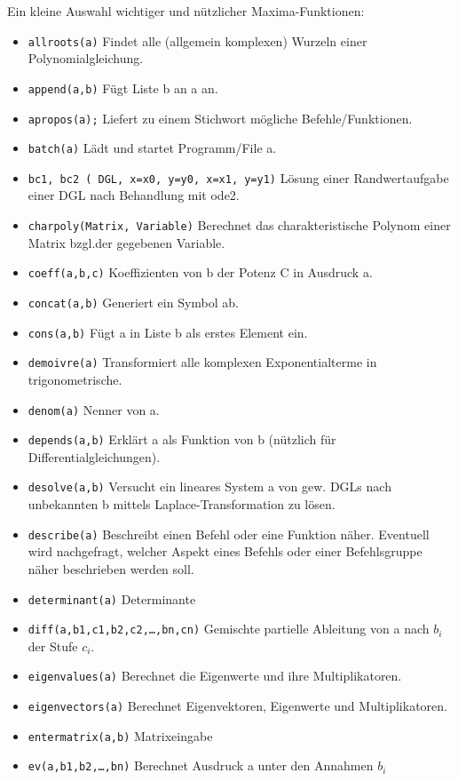 \documentclass[12pt]{scrartcl}
\begin{document}
Ein kleine Auswahl wichtiger und nützlicher Maxima-Funktionen:

\begin{itemize}
\item \texttt{allroots(a)} Findet alle (allgemein komplexen) Wurzeln
  einer  Polynomialgleichung.
\item \texttt{append(a,b)} Fügt Liste b an a an.
\item \texttt{apropos(a);} Liefert zu einem Stichwort mögliche Befehle/Funktionen.
\item \texttt{batch(a)} Lädt und startet Programm/File a.
\item \texttt{bc1, bc2 ( DGL, x=x0, y=y0, x=x1, y=y1)} Lösung einer
  Randwertaufgabe einer DGL nach Behandlung mit ode2.
\item \texttt{charpoly(Matrix, Variable)} Berechnet das
  charakteristische Polynom einer Matrix bzgl.\@ der gegebenen  Variable.
\item \texttt{coeff(a,b,c)} Koeffizienten von b der Potenz C in Ausdruck a.
\item \texttt{concat(a,b)} Generiert ein Symbol ab.
\item \texttt{cons(a,b)} Fügt a in Liste b als erstes Element ein.
\item \texttt{demoivre(a)} Transformiert alle komplexen Exponentialterme in trigonometrische.
\item \texttt{denom(a)} Nenner von a.
\item \texttt{depends(a,b)} Erklärt a als Funktion von b (nützlich für Differentialgleichungen).
\item \texttt{desolve(a,b)} Versucht ein lineares System a von gew. DGLs
  nach unbekannten b mittels Laplace-Transformation  zu lösen.
\item \texttt{describe(a)} Beschreibt einen Befehl oder eine Funktion
  näher.  Eventuell wird nachgefragt, welcher Aspekt eines Befehls oder
  einer Befehlsgruppe näher beschrieben  werden soll.
\item \texttt{determinant(a)} Determinante
\item \texttt{diff(a,b1,c1,b2,c2,\ldots,bn,cn)} Gemischte partielle Ableitung von a nach $b_i$ der Stufe $c_i$.
\item \texttt{eigenvalues(a)} Berechnet die Eigenwerte und ihre Multiplikatoren.
\item \texttt{eigenvectors(a)} Berechnet Eigenvektoren, Eigenwerte und  Multiplikatoren.
\item \texttt{entermatrix(a,b)} Matrixeingabe
\item \texttt{ev(a,b1,b2,\ldots,bn)} Berechnet Ausdruck a unter den Annahmen $b_i$

\end{itemize}
\end{document}
